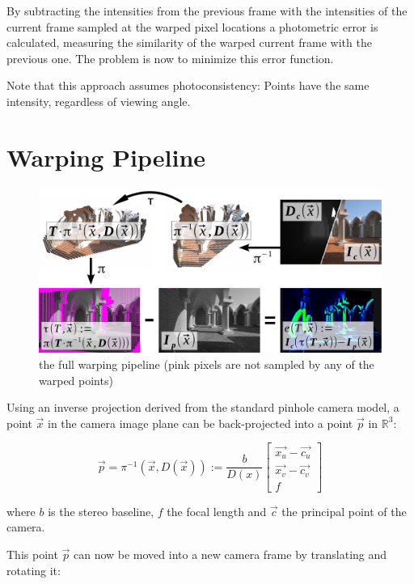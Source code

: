 By subtracting the intensities from the previous frame with the
intensities of the current frame sampled at the warped pixel locations a
photometric error is calculated, measuring the similarity of the warped current
frame with the previous one. The problem is now to minimize this error function.

Note that this approach assumes photoconsistency: Points have the same
intensity, regardless of viewing angle.


\section{Warping Pipeline}

\begin{figure}[h]
    \centering
    \includegraphics[width=\textwidth]{images/warp_pipeline.pdf}
    \caption{the full warping pipeline (pink pixels are not sampled by any of the warped points)}
    \label{fig:warp_pipeline}
\end{figure}


Using an inverse projection derived from the standard pinhole camera model, a
point $ \vec{x} $ in the camera image plane can be back-projected into a point
$ \vec{p} $ in $ \mathbb{R}^3 $:

\begin{equation}
    \vec{p} = \pi^{-1}(\vec{x}, D(\vec{x})) := \frac{b}{D(x)}
    \begin{bmatrix}
        \vec{x_u} - \vec{c_u} \\
        \vec{x_v} - \vec{c_v} \\
        f
    \end{bmatrix}
\end{equation}

where $b$ is the stereo baseline, $f$ the focal length and $\vec{c}$ the principal point of the camera.

This point $\vec{p}$ can now be moved into a new camera frame by translating and rotating it:

